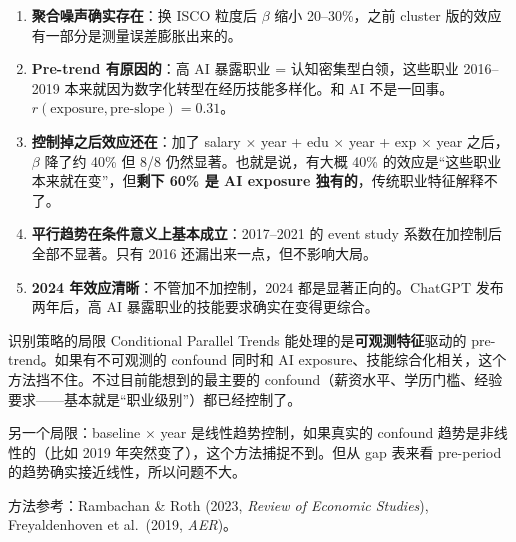 \documentclass[12pt,a4paper]{article}
\begin{document}
\begin{exambox}[总结]
\begin{enumerate}
  \item \textbf{聚合噪声确实存在}：换 ISCO 粒度后 $\beta$ 缩小 20--30\%，之前 cluster 版的效应有一部分是测量误差膨胀出来的。

  \item \textbf{Pre-trend 有原因的}：高 AI 暴露职业 = 认知密集型白领，这些职业 2016--2019 本来就因为数字化转型在经历技能多样化。和 AI 不是一回事。$r(\text{exposure}, \text{pre-slope}) = 0.31$。

  \item \textbf{控制掉之后效应还在}：加了 salary $\times$ year + edu $\times$ year + exp $\times$ year 之后，$\beta$ 降了约 40\% 但 8/8 仍然显著。也就是说，有大概 40\% 的效应是“这些职业本来就在变”，但\textbf{剩下 60\% 是 AI exposure 独有的}，传统职业特征解释不了。

  \item \textbf{平行趋势在条件意义上基本成立}：2017--2021 的 event study 系数在加控制后全部不显著。只有 2016 还漏出来一点，但不影响大局。

  \item \textbf{2024 年效应清晰}：不管加不加控制，2024 都是显著正向的。ChatGPT 发布两年后，高 AI 暴露职业的技能要求确实在变得更综合。
\end{enumerate}
\end{exambox}

\begin{defbox}{识别策略的局限}
Conditional Parallel Trends 能处理的是\textbf{可观测特征}驱动的 pre-trend。如果有不可观测的 confound 同时和 AI exposure、技能综合化相关，这个方法挡不住。不过目前能想到的最主要的 confound（薪资水平、学历门槛、经验要求——基本就是“职业级别”）都已经控制了。

另一个局限：baseline $\times$ year 是线性趋势控制，如果真实的 confound 趋势是非线性的（比如 2019 年突然变了），这个方法捕捉不到。但从 gap 表来看 pre-period 的趋势确实接近线性，所以问题不大。

方法参考：Rambachan \& Roth (2023, \textit{Review of Economic Studies}), Freyaldenhoven et al.\ (2019, \textit{AER})。
\end{defbox}
\end{document}
